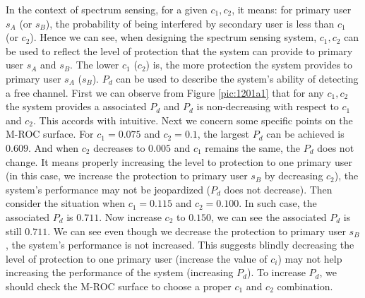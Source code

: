 In the context of spectrum sensing, for a given $c_1, c_2$, it means: for primary user $s_A$ (or $s_B$), the probability of being interfered by secondary user is less than $c_1$ (or $c_2$). Hence we can see, when designing the spectrum sensing system,  $c_1, c_2$ can be used to reflect the level of protection that the system can provide to primary user $s_A$ and $s_B$.  The lower $c_1$ ($c_2$) is, the more protection the system provides to primary user $s_A$ ($s_B$). $P_d$ can be used to describe the system's ability of detecting a free channel.   First we can observe from Figure \ref{pic:1201a1} that for any $c_1, c_2$ the system provides a associated $P_d$ and $P_d$ is non-decreasing with respect to $c_1$ and $c_2$. This accords with intuitive.     
Next we concern some specific points on the M-ROC surface. For $c_1 = 0.075$ and $c_2  = 0.1$, the largest $P_d$ can be achieved is $0.609$. And when $c_2$ decreases to $0.005$ and  $c_1$ remains the same, the $P_d$ does not change.   
 It means properly increasing the level to protection to one primary user (in this case, we increase the protection to primary user $s_B$ by decreasing $c_2$), the system's performance may not be jeopardized ($P_d$ does not decrease).  
Then consider the situation when $c_1 = 0.115$ and $c_2 = 0.100$. In such case, the associated $P_d$ is $0.711$. Now increase $c_2$ to $0.150$, we can see the associated $P_d$ is still $0.711$. We can see even though we decrease the protection to primary user $s_B$, the system's performance is not increased.  
This suggests blindly decreasing the level of protection to one primary user (increase the value of $c_i$) may not help increasing the performance of the system (increasing $P_d$). To increase $P_d$, we should check the M-ROC surface to choose a proper $c_1$ and $c_2$ combination.

